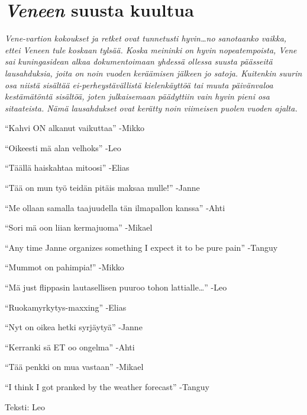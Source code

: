 
\section{\textit{Veneen} suusta kuultua}

\textit{Vene-vartion kokoukset ja retket ovat tunnetusti hyvin…no sanotaanko vaikka,
ettei Veneen tule koskaan tylsää. Koska meininki on hyvin nopeatempoista, Vene
sai kuningasidean alkaa dokumentoimaan yhdessä ollessa suusta päässeitä
lausahduksia, joita on noin vuoden keräämisen jälkeen jo satoja. Kuitenkin
suurin osa niistä sisältää ei-perheystävällistä kielenkäyttöä tai muuta
päivänvaloa kestämätöntä sisältöä, joten julkaisemaan päädyttiin vain hyvin
pieni osa sitaateista. Nämä lausahdukset ovat kerätty noin viimeisen puolen
vuoden ajalta.}

{\setlength{\parskip}{1em}\setlength{\parindent}{0pt}

“Kahvi ON alkanut vaikuttaa” -Mikko

“Oikeesti mä alan velhoks” -Leo

“Täällä haiskahtaa mitoosi” -Elias

“Tää on mun työ teidän pitäis maksaa mulle!” -Janne

“Me ollaan samalla taajuudella tän ilmapallon kanssa” -Ahti

“Sori mä oon liian kermajuoma” -Mikael

“Any time Janne organizes something I expect it to be pure pain” -Tanguy

“Mummot on pahimpia!” -Mikko

“Mä just flippasin lautasellisen puuroo tohon lattialle…” -Leo

“Ruokamyrkytys-maxxing” -Elias

“Nyt on oikea hetki syrjäytyä” -Janne

“Kerranki sä ET oo ongelma” -Ahti

“Tää penkki on mua vastaan” -Mikael

“I think I got pranked by the weather forecast” -Tanguy}

\vfill

\noindent\null\hfill Teksti: Leo

